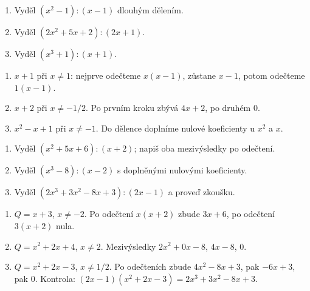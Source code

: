 \documentclass[11pt,a4paper]{article}
\begin{document}

\begin{zadaniReseniBox}[title={Procvičení},breakable=false]
\begin{enumerate}[label=\alph*)]
\item Vyděl $(x^2-1):(x-1)$ dlouhým dělením.
\item Vyděl $(2x^2+5x+2):(2x+1)$.
\item Vyděl $(x^3+1):(x+1)$.
\end{enumerate}
\tcblower
\begin{enumerate}[label=\alph*)]
\item $x+1$ při $x\ne1$: nejprve odečteme $x(x-1)$, zůstane $x-1$, potom odečteme $1(x-1)$.
\item $x+2$ při $x\ne-1/2$. Po prvním kroku zbývá $4x+2$, po druhém $0$.
\item $x^2-x+1$ při $x\ne-1$. Do dělence doplníme nulové koeficienty u $x^2$ a $x$.
\end{enumerate}
\end{zadaniReseniBox}






\begin{zadaniReseniBox}[title={Domácí dělení beze zbytku},breakable=false]
\begin{enumerate}[label=\alph*)]
\item Vyděl $(x^2+5x+6):(x+2)$; napiš oba mezivýsledky po odečtení.
\item Vyděl $(x^3-8):(x-2)$ s doplněnými nulovými koeficienty.
\item Vyděl $(2x^3+3x^2-8x+3):(2x-1)$ a proveď zkoušku.
\end{enumerate}
\tcblower
\begin{enumerate}[label=\alph*)]
\item $Q=x+3$, $x\ne-2$. Po odečtení $x(x+2)$ zbude $3x+6$, po odečtení $3(x+2)$ nula.
\item $Q=x^2+2x+4$, $x\ne2$. Mezivýsledky $2x^2+0x-8$, $4x-8$, $0$.
\item $Q=x^2+2x-3$, $x\ne1/2$. Po odečteních zbude $4x^2-8x+3$, pak $-6x+3$, pak $0$. Kontrola: $(2x-1)(x^2+2x-3)=2x^3+3x^2-8x+3$.
\end{enumerate}
\end{zadaniReseniBox}
\end{document}
